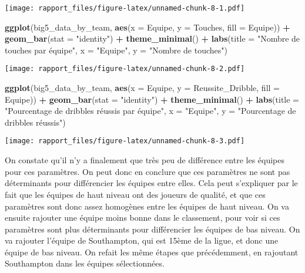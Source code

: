 \documentclass[
]{article}
\newenvironment{Shaded}{\begin{snugshade}}{\end{snugshade}}
\newcommand{\AttributeTok}[1]{\textcolor[rgb]{0.13,0.29,0.53}{#1}}
\newcommand{\FunctionTok}[1]{\textcolor[rgb]{0.13,0.29,0.53}{\textbf{#1}}}
\newcommand{\NormalTok}[1]{#1}
\newcommand{\SpecialCharTok}[1]{\textcolor[rgb]{0.81,0.36,0.00}{\textbf{#1}}}
\newcommand{\StringTok}[1]{\textcolor[rgb]{0.31,0.60,0.02}{#1}}
\begin{document}
\texttt{[image: rapport\_files/figure-latex/unnamed-chunk-8-1.pdf]}

\begin{Shaded}
\begin{Highlighting}[]
\FunctionTok{ggplot}\NormalTok{(big5\_data\_by\_team, }\FunctionTok{aes}\NormalTok{(}\AttributeTok{x =}\NormalTok{ Equipe, }\AttributeTok{y =}\NormalTok{ Touches, }\AttributeTok{fill =}\NormalTok{ Equipe)) }\SpecialCharTok{+} \FunctionTok{geom\_bar}\NormalTok{(}\AttributeTok{stat =} \StringTok{"identity"}\NormalTok{) }\SpecialCharTok{+} \FunctionTok{theme\_minimal}\NormalTok{() }\SpecialCharTok{+} \FunctionTok{labs}\NormalTok{(}\AttributeTok{title =} \StringTok{"Nombre de touches par équipe"}\NormalTok{, }\AttributeTok{x =} \StringTok{"Equipe"}\NormalTok{, }\AttributeTok{y =} \StringTok{"Nombre de touches"}\NormalTok{)}
\end{Highlighting}
\end{Shaded}

\texttt{[image: rapport\_files/figure-latex/unnamed-chunk-8-2.pdf]}

\begin{Shaded}
\begin{Highlighting}[]
\FunctionTok{ggplot}\NormalTok{(big5\_data\_by\_team, }\FunctionTok{aes}\NormalTok{(}\AttributeTok{x =}\NormalTok{ Equipe, }\AttributeTok{y =}\NormalTok{ Reussite\_Dribble, }\AttributeTok{fill =}\NormalTok{ Equipe)) }\SpecialCharTok{+} \FunctionTok{geom\_bar}\NormalTok{(}\AttributeTok{stat =} \StringTok{"identity"}\NormalTok{) }\SpecialCharTok{+} \FunctionTok{theme\_minimal}\NormalTok{() }\SpecialCharTok{+} \FunctionTok{labs}\NormalTok{(}\AttributeTok{title =} \StringTok{"Pourcentage de dribbles réussis par équipe"}\NormalTok{, }\AttributeTok{x =} \StringTok{"Equipe"}\NormalTok{, }\AttributeTok{y =} \StringTok{"Pourcentage de dribbles réussis"}\NormalTok{)}
\end{Highlighting}
\end{Shaded}

\texttt{[image: rapport\_files/figure-latex/unnamed-chunk-8-3.pdf]}

On constate qu'il n'y a finalement que très peu de différence entre les
équipes pour ces paramètres. On peut donc en conclure que ces paramètres
ne sont pas déterminants pour différencier les équipes entre elles. Cela
peut s'expliquer par le fait que les équipes de haut niveau ont des
joueurs de qualité, et que ces paramètres sont donc assez homogènes
entre les équipes de haut niveau. On va ensuite rajouter une équipe
moins bonne dans le classement, pour voir si ces paramètres sont plus
déterminants pour différencier les équipes de bas niveau. On va rajouter
l'équipe de Southampton, qui est 15ème de la ligue, et donc une équipe
de bas niveau. On refait les même étapes que précédemment, en rajoutant
Southampton dans les équipes sélectionnées.
\end{document}
